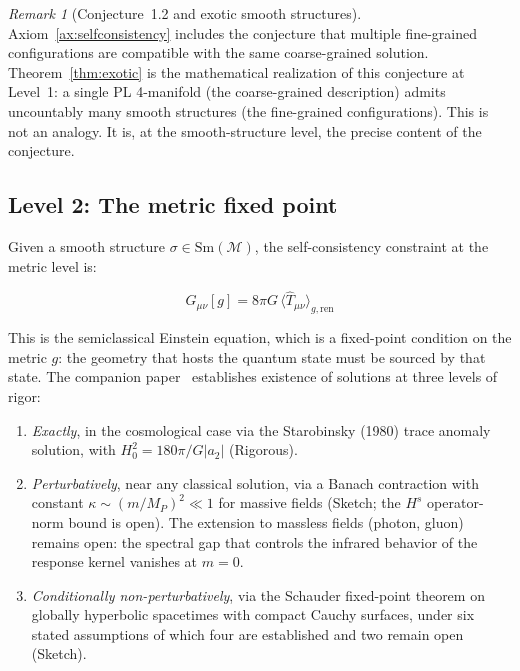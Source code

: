 \documentclass[12pt,a4paper]{article}
\theoremstyle{definition}
\theoremstyle{remark}
\newtheorem{remark}{Remark}
\begin{document}
\begin{remark}[Conjecture~1.2 and exotic smooth structures]
Axiom~\ref{ax:selfconsistency} includes the conjecture that multiple
fine-grained configurations are compatible with the same coarse-grained
solution. Theorem~\ref{thm:exotic} is the mathematical realization of this
conjecture at Level~1: a single PL 4-manifold (the coarse-grained description)
admits uncountably many smooth structures (the fine-grained configurations).
This is not an analogy. It is, at the smooth-structure level, the precise
content of the conjecture.
\end{remark}

\subsection{Level 2: The metric fixed point}
\label{sec:level2}

Given a smooth structure $\sigma \in \mathrm{Sm}(\mathcal{M})$, the
self-consistency constraint at the metric level is:

\begin{equation}
G_{\mu\nu}[g] = 8\pi G\,\langle\hat{T}_{\mu\nu}\rangle_{g,\mathrm{ren}}
\label{eq:sce}
\end{equation}

This is the semiclassical Einstein equation, which is a fixed-point condition
on the metric $g$: the geometry that hosts the quantum state must be sourced by
that state. The companion paper~\cite{fixed_point} establishes existence of
solutions at three levels of rigor:

\begin{enumerate}

\item \emph{Exactly}, in the cosmological case via the Starobinsky
(1980) trace anomaly solution, with $H_0^2 = 180\pi/G|a_2|$ (Rigorous).

\item \emph{Perturbatively}, near any classical solution, via a Banach
contraction with constant $\kappa \sim (m/M_P)^2 \ll 1$ for massive fields
(Sketch; the $H^s$ operator-norm bound is open). The extension to massless
fields (photon, gluon) remains open: the spectral gap that controls the
infrared behavior of the response kernel vanishes at $m = 0$.

\item \emph{Conditionally non-perturbatively}, via the Schauder fixed-point
theorem on globally hyperbolic spacetimes with compact Cauchy surfaces, under
six stated assumptions of which four are established and two remain open
(Sketch).

\end{enumerate}
\end{document}
